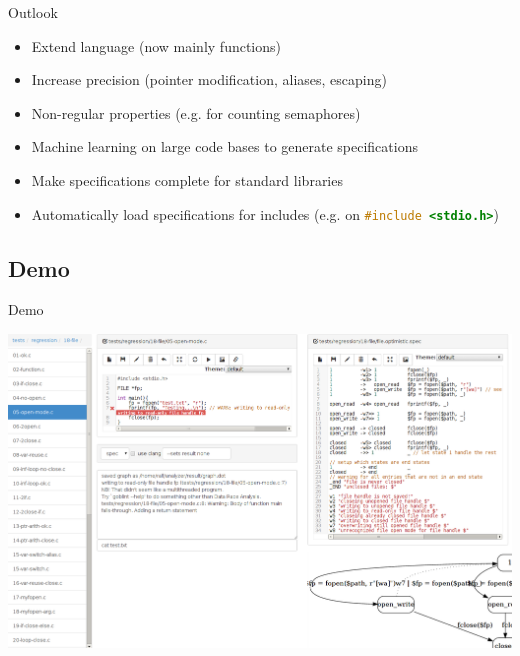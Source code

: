 \documentclass{beamer}
\newcommand{\inlineC}[1]{\lstinline[language=C]$#1$}
\begin{document}
\begin{frame}[fragile]{Outlook}
\begin{itemize}
\item Extend language (now mainly functions)
\item Increase precision (pointer modification, aliases, escaping)
\item Non-regular properties (e.g. for counting semaphores)
\end{itemize} \pause
\begin{itemize}
\item Machine learning on large code bases to generate specifications
\item Make specifications complete for standard libraries
\item Automatically load specifications for includes (e.g. on \inlineC{#include <stdio.h>})
\end{itemize}
\end{frame}


\subsection{Demo}

\begin{frame}[fragile]{Demo}
\begin{center}
\includegraphics[width=\linewidth]{graphics/webapp_small.png}
\end{center}

\end{frame}



\end{document}
